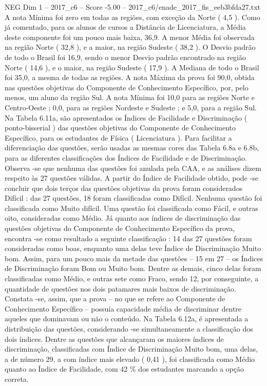 \begin{textsample}{NEG Dim 1 – 2017\_c6 – Score -5.00 – 2017\_c6/enade\_2017\_fis\_eeb3bfda27.txt}
A nota Mínima foi zero em todas as regiões, com exceção da Norte ( 4,5 ).
Como já comentado, para os alunos de cursos a Distância de Licenciatura, a Média deste componente foi um pouco mais baixa, 36,9.
A menor Média foi observada na região Norte ( 32,8 ), e a maior, na região Sudeste ( 38,2 ).
O Desvio padrão de todo o Brasil foi 16,9, sendo o menor Desvio padrão encontrado na região Norte ( 14,6 ), e o maior, na região Sudeste ( 17,9 ).
A Mediana de todo o Brasil foi 35,0, a mesma de todas as regiões.
A nota Máxima da prova foi 90,0, obtida nas questões objetivas do Componente de Conhecimento Específico, por, pelo menos, um aluno da região Sul.
A nota Mínima foi 10,0 para as regiões Norte e Centro-Oeste ; 0,0, para as regiões Nordeste e Sudeste ; e 5,0, para a região Sul.
Na Tabela 6.11a, são apresentados os Índices de Facilidade e Discriminação ( ponto-bisserial ) das questões objetivas do Componente de Conhecimento Específico, para os estudantes de Física ( Licenciatura ).
Para facilitar a diferenciação das questões, serão usadas as mesmas cores das Tabela 6.8a e 6.8b, para as diferentes classificações dos Índices de Facilidade e de Discriminação.
Observa -se que nenhuma das questões foi anulada pela CAA, e as análises dizem respeito às 27 questões válidas.
A partir do Índice de Facilidade obtido, pode -se concluir que dois terços das questões objetivas da prova foram considerados Difícil : das 27 questões, 18 foram classificadas como Difícil.
Nenhuma questão foi classificada como Muito difícil.
Uma questão foi classificada como Fácil, e outras oito, consideradas como Médio.
Já quanto aos índices de discriminação das questões objetivas do Componente de Conhecimento Específico da prova, encontra -se como resultado a seguinte classificação : 14 das 27 questões foram consideradas como boas, enquanto uma delas teve Índice de Discriminação Muito bom.
Assim, para um pouco mais da metade das questões – 15 em 27 – os Índices de Discriminação foram Bom ou Muito bom.
Dentre as demais, cinco delas foram classificadas como Médio, e outras sete como Fraco, sendo 12, por conseguinte, a quantidade de questões nos dois patamares mais baixos de discriminação.
Constata -se, assim, que a prova – no que se refere ao Componente de Conhecimento Específico – possuía capacidade média de discriminar dentre aqueles que dominavam ou não o conteúdo.
Na Tabela 6.12a, é apresentada a distribuição das questões, considerando -se simultaneamente a classificação dos dois índices.
Dentre as questões que alcançaram os maiores índices de discriminação, classificadas com Índice de Discriminação Muito bom, uma delas, a de número 29, a com índice mais elevado ( 0,41 ), foi classificada como Médio quanto ao Índice de Facilidade, com 42 \% dos estudantes marcando a opção correta.

\end{textsample}

